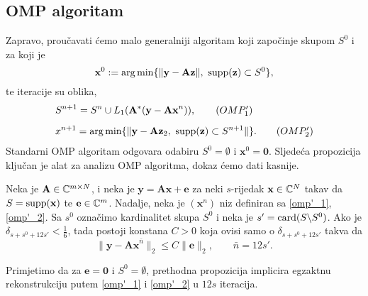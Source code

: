 \documentclass[a4paper,twoside,12pt]{memoir} %
\newcommand{\vect}[1]{\mathbf{#1}}
\renewcommand{\vec}{\vect}
\newcommand{\card}{\text{\normalfont{card}}}
\newcommand{\supp}{\text{\normalfont{supp}}}
\newcommand{\norm}[1]{\|{#1}\|}
\DeclareMathOperator*{\argmin}{arg\,min}
\begin{document}
\subsection[OMP algoritam][OMP algoritam]{OMP algoritam}
Zapravo, prou\v{c}avati \'cemo malo generalniji algoritam koji zapo\v{c}inje skupom $S^0$ i za koji je
\begin{equation}\label{6:40}
    \vec x^0 := \argmin\{\norm{\vec y - \vec{Az}},\ \supp(\vec z) \subset S^0\},
\end{equation}
te iteracije su oblika,
\begin{align}
    &S^{n+1} = S^n \cup L_1(\vec A^*(\vec y - \vec{Ax}^n)), \tag{$OMP'_1$}\label{omp'_1}\\[0.5em]
    &x^{n+1} = \argmin\{\norm{\vec y - \vec{Az}_2,\ \supp(\vec z) \subset S^{n+1}}\}. \tag{$OMP'_2$}\label{omp'_2}
\end{align}
Standarni OMP algoritam odgovara odabiru $S^0 = \emptyset$ i $\vec x^0 = \vec 0$. Sljede\'ca propozicija klju\v{c}an je alat za analizu OMP algoritma, dokaz \'cemo dati kasnije.
\begin{prop}\label{prop:6:24}
    Neka je $\vec A \in \C^{m \times N}$, i neka je $\vec y = \vec{Ax} + \vec e$ za neki $s$-rijedak $\vec x \in \C^N$ takav da $S = \supp(\vec x)$ te $\vec e \in \C^m$. Nadalje, neka je $(\vec x^n)$ niz definiran sa \eqref{omp'_1}, \eqref{omp'_2}. Sa $s^0$ ozna\v{c}imo kardinalitet skupa $S^0$ i neka je $s' = \card(S \backslash S^0)$. Ako je $\delta_{s+s^0+12s'} < \frac{1}{6}$, tada postoji konstana $C > 0$ koja ovisi samo o $\delta_{s+s^0+12s'}$ takva da
    \begin{equation*}
        \norm{\vec y - \vec{Ax}^{\bar n}}_2 \leq C \norm{\vec e}_2,\quad \quad \bar n = 12s'.
    \end{equation*}
\end{prop}
Primjetimo da za $\vec e = \vec 0$ i $S^0 = \emptyset$, prethodna propozicija implicira egzaktnu rekonstrukciju putem \eqref{omp'_1} i \eqref{omp'_2} u $12s$ iteracija. 
\end{document}
